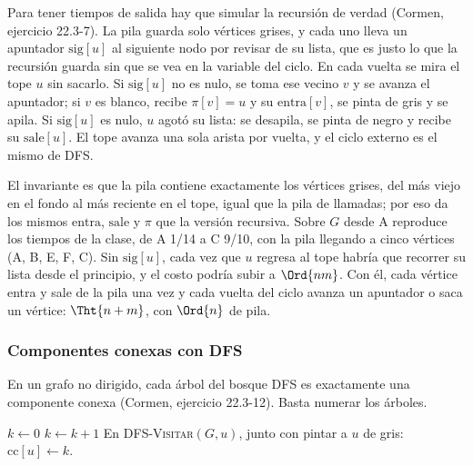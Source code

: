 \documentclass[11pt,letterpaper]{article}
\begin{document}
Para tener tiempos de salida hay que simular la recursión de verdad
(Cormen, ejercicio 22.3-7). La pila guarda solo vértices grises, y
cada uno lleva un apuntador $\text{sig}[u]$ al siguiente nodo por
revisar de su lista, que es justo lo que la recursión guarda sin que
se vea en la variable del ciclo. En cada vuelta se mira el tope $u$
sin sacarlo. Si $\text{sig}[u]$ no es nulo, se toma ese vecino $v$ y
se avanza el apuntador; si $v$ es blanco, recibe $\pi[v] = u$ y su
$\text{entra}[v]$, se pinta de gris y se apila. Si $\text{sig}[u]$ es
nulo, $u$ agotó su lista: se desapila, se pinta de negro y recibe su
$\text{sale}[u]$. El tope avanza una sola arista por vuelta, y el
ciclo externo es el mismo de \textsc{DFS}.

El invariante es que la pila contiene exactamente los vértices grises,
del más viejo en el fondo al más reciente en el tope, igual que la
pila de llamadas; por eso da los mismos $\text{entra}$, $\text{sale}$
y $\pi$ que la versión recursiva. Sobre $G$ desde A reproduce los
tiempos de la clase, de A 1/14 a C 9/10, con la pila llegando a cinco
vértices (A, B, E, F, C). Sin $\text{sig}[u]$, cada vez que $u$
regresa al tope habría que recorrer su lista desde el principio, y el
costo podría subir a $\Ord{nm}$. Con él, cada vértice entra y sale de
la pila una vez y cada vuelta del ciclo avanza un apuntador o saca un
vértice: $\Tht{n + m}$, con $\Ord{n}$ de pila.

\subsubsection*{Componentes conexas con DFS}

En un grafo no dirigido, cada árbol del bosque DFS es exactamente una
componente conexa (Cormen, ejercicio 22.3-12). Basta numerar los
árboles.

\begin{algorithm}[H]
\caption{Cambio a \textsc{DFS} para numerar las componentes}
\label{alg:busq-componentes}
\begin{algorithmic}[1]
\State $k \gets 0$ 
    \State $k \gets k + 1$ 
    \State {}
  \EndIf
\EndFor
\Statex En \textsc{DFS-Visitar}$(G, u)$, junto con pintar a $u$ de
  gris: $\text{cc}[u] \gets k$.
\end{algorithmic}
\end{algorithm}
\end{document}
